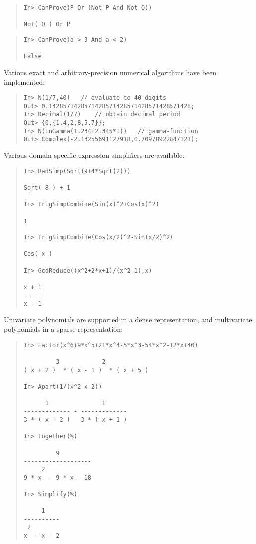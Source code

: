 \documentclass{llncs}
\begin{document}
\begin{quote}\small\begin{verbatim}
In> CanProve(P Or (Not P And Not Q))

Not( Q ) Or P
\end{verbatim}\end{quote}


\begin{quote}\small\begin{verbatim}
In> CanProve(a > 3 And a < 2)

False
\end{verbatim}\end{quote}


Various exact and arbitrary-precision numerical algorithms have been
implemented:


\begin{quote}\small\begin{verbatim}
In> N(1/7,40)	// evaluate to 40 digits
Out> 0.1428571428571428571428571428571428571428;
In> Decimal(1/7)	// obtain decimal period
Out> {0,{1,4,2,8,5,7}};
In> N(LnGamma(1.234+2.345*I))	// gamma-function
Out> Complex(-2.13255691127918,0.70978922847121);
\end{verbatim}\end{quote}


Various domain-specific expression simplifiers are available:


\begin{quote}\small\begin{verbatim}
In> RadSimp(Sqrt(9+4*Sqrt(2)))

Sqrt( 8 ) + 1

In> TrigSimpCombine(Sin(x)^2+Cos(x)^2)

1

In> TrigSimpCombine(Cos(x/2)^2-Sin(x/2)^2)

Cos( x )

In> GcdReduce((x^2+2*x+1)/(x^2-1),x)

x + 1
-----
x - 1
\end{verbatim}\end{quote}


Univariate polynomials are supported in a dense representation, 
and multivariate polynomials in a sparse representation:


\begin{quote}\small\begin{verbatim}
In> Factor(x^6+9*x^5+21*x^4-5*x^3-54*x^2-12*x+40)

         3            2            
( x + 2 )  * ( x - 1 )  * ( x + 5 )

In> Apart(1/(x^2-x-2))

      1               1      
------------- - -------------
3 * ( x - 2 )   3 * ( x + 1 )

In> Together(%)

         9         
-------------------
     2             
9 * x  - 9 * x - 18

In> Simplify(%)

     1     
----------
 2        
x  - x - 2

\end{verbatim}\end{quote}
\end{document}
